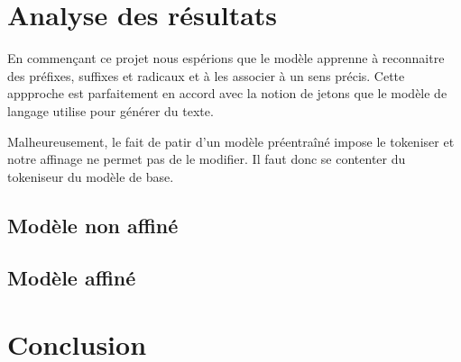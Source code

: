 \documentclass[french]{template}
\begin{document}
\section{Analyse des résultats}

En commençant ce projet nous espérions que le modèle apprenne à reconnaitre des préfixes, suffixes et radicaux et à les associer à un sens précis. Cette appproche est parfaitement en accord avec la notion de jetons que le modèle de langage utilise pour générer du texte.

Malheureusement, le fait de patir d'un modèle préentraîné impose le tokeniser et notre affinage ne permet pas de le modifier. Il faut donc se contenter du tokeniseur du modèle de base.

\subsection{Modèle non affiné}


\subsection{Modèle affiné}


\section{Conclusion}

\end{document}
